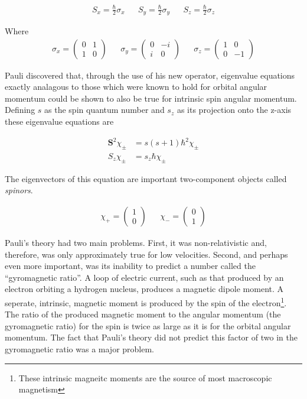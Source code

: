 \documentclass[a4paper,12pt]{book}
\begin{document}
\begin{align}
S_{x}=\frac{\hbar}{2}\sigma_{x} &&
S_{y}=\frac{\hbar}{2} \sigma_{y} &&
S_{z}=\frac{\hbar}{2} \sigma_{z}
\end{align}

Where
\begin{align}
\sigma_{x}=\left( \begin{array}{cc}
0 & 1 \\
1 & 0 \end{array} \right) &&
\sigma_{y}=\left( \begin{array}{cc}
0 & -i \\
i & 0 \end{array} \right) &&
\sigma_{z}=\left( \begin{array}{cc}
1 & 0 \\
0 & -1 \end{array} \right)
\end{align}

Pauli discovered that, through the use of his new operator, eigenvalue equations exactly analagous to those which were known to hold for orbital angular momentum could be shown to also be true for intrinsic spin angular momentum. Defining $s$ as the spin quantum number and $s_{z}$ as its projection onto the z-axis these eigenvalue equations are

\begin{subequations}\label{grp2}
\begin{align}
\mathbf{S}^{2}\chi_{\pm}&=s(s+1)\hbar^{2}\chi_{\pm}\label{third}\\
S_{z}\chi_{\pm}&=s_{z}\hbar \chi_{\pm} \label{fourth}
\end{align}
\end{subequations}

The eigenvectors of this equation are important two-component objects called \textit{spinors}.

\begin{align}
\chi_{+}=
\left( \begin{array}{c}
1 \\
0 \end{array} \right)&&
\chi_{-}=
\left( \begin{array}{c}
0 \\
1 \end{array} \right)
\end{align}

Pauli's theory had two main problems. First, it was non-relativistic and, therefore, was only approximately true for low velocities. Second, and perhaps even more important, was its inability to predict a number called the ``gyromagnetic ratio''. A loop of electric current, such as that produced by an electron orbiting a hydrogen nucleus, produces a magnetic dipole moment. A seperate, intrinsic, magnetic moment is  produced by the spin of the electron\footnote{These intrinsic magneitc moments are  the source of most macroscopic magnetism}. The ratio of the produced magnetic moment to the angular momentum (the gyromagnetic ratio) for the spin is twice as large as it is for the orbital angular momentum. The fact that Pauli's theory did not predict this factor of two in the gyromagnetic ratio was a major problem.
\end{document}

